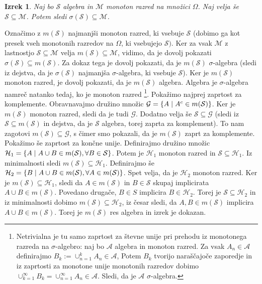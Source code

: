\documentclass[12pt,a4paper]{amsart}
\theoremstyle{definition} %
\theoremstyle{plain} %
\newtheorem{izrek}[definicija]{Izrek}
\begin{document}
\begin{izrek} Naj bo $\mathcal{S}$ algebra in $\mathcal{M}$ monoton razred na množici $\Omega$. Naj velja še $\mathcal{S} \subseteq \mathcal{M}$. Potem sledi $\sigma{(\mathcal{S})} \subseteq \mathcal{M}$.
\end{izrek}
\proof
 Označimo z $m(\mathcal{S})$ najmanjši monoton razred, ki vsebuje $\mathcal{S}$ (dobimo ga kot presek vseh monotonih razredov na $\Omega$, ki vsebujejo $\mathcal{S}).$ Ker za vsak $\mathcal{M}$ z lastnostjo $\mathcal{S} \subseteq \mathcal{M}$ velja $m(\mathcal{S}) \subseteq \mathcal{M}$, vidimo, da je dovolj pokazati $\sigma(\mathcal{S}) \subseteq m(\mathcal{S})$. Za dokaz tega je dovolj pokazati, da je $m(\mathcal{S}) $ $\sigma$-algebra (sledi iz dejstva, da je $\sigma(\mathcal{S})$ najmanjša $\sigma$-algebra, ki vsebuje $\mathcal{S}$). Ker je $m(\mathcal{S})$ monoton razred, je dovolj pokazati, da je $m(\mathcal{S})$ algebra. Algebra je $\sigma$-algebra namreč natanko tedaj, ko je monoton razred \footnote{Netrivialna je tu samo zaprtost za števne unije pri prehodu iz monotonega razreda na $\sigma$-algebro: naj bo $\mathcal{A}$ algebra in monoton razred. Za vsak $A_n \in \mathcal{A}$ definirajmo $B_k:=\cup_{n=1}^k A_n \in \mathcal{A}$, Potem $B_k$ tvorijo naraščajoče zaporedje in iz zaprtosti za monotone unije monotonih razredov dobimo $\cup_{k=1}^\infty B_k=\cup_{n=1}^\infty A_n \in \mathcal{A}$. Sledi, da je $\mathcal{A}$ $\sigma$-algebra.}.
\newline
Pokažimo najprej zaprtost za komplemente. Obravnavajmo družino množic $\mathcal{G} = \{ A\hspace{0.1cm}|\hspace{0.1cm} A^c \in m(\mathcal{S})\}$.  Ker je $m(\mathcal{S})$ monoton razred, sledi da je tudi $\mathcal{G}$. Dodatno velja še $\mathcal{S} \subseteq \mathcal{G}$ (sledi iz $\mathcal{S} \subseteq m(\mathcal{S})$ in dejstva, da je $\mathcal{S}$ algebra, torej zaprta za komplement). To nam zagotovi $m(\mathcal{S}) \subseteq \mathcal{G}$, s čimer smo pokazali, da je $m(\mathcal{S})$ zaprt za komplemente.
\newline
Pokažimo še zaprtost za končne unije. Definirajmo družino množic $\mathcal{H}_1 = \{ A\hspace{0.1cm}|\hspace{0.1cm} A \cup B \in m(\mathcal{S}), \forall B \in \mathcal{S}\}$. Potem je $\mathcal{H}_1$ monoton razred in $\mathcal{S} \subseteq \mathcal{H}_1$. Iz minimalnosti sledi $m(\mathcal{S}) \subseteq \mathcal{H}_1$. Definirajmo še  $\mathcal{H}_2 = \{ B\hspace{0.1cm}|\hspace{0.1cm} A \cup B \in m(\mathcal{S}), \forall A \in m(\mathcal{S})\}$. Spet velja, da je $\mathcal{H}_2$ monoton razred. Ker je $m(\mathcal{S}) \subseteq \mathcal{H}_1$, sledi da $A \in m(\mathcal{S})$ in $B \in \mathcal{S}$ skupaj implicirata $A \cup B \in m(\mathcal{S})$. Povedano drugače, $B \in S$ implicira $B \in \mathcal{H}_2$. Torej je $\mathcal{S} \subseteq \mathcal{H}_2$  in iz minimalnosti dobimo $m(\mathcal{S}) \subseteq \mathcal{H}_2$, iz česar sledi, da $A,B \in m(\mathcal{S})$ implicira $A \cup B \in m(\mathcal{S})$. Torej je $m(\mathcal{S})$ res algebra in izrek je dokazan.
\end{document}
